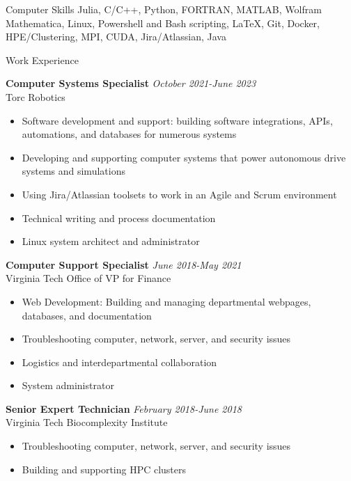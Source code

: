 \documentclass{resume} %
\begin{document}
\begin{rSection}{Computer Skills}
    Julia, C/C++, Python, FORTRAN, MATLAB, Wolfram Mathematica, Linux, Powershell and Bash scripting, LaTeX, Git, Docker, HPE/Clustering, MPI, CUDA, Jira/Atlassian, Java
\end{rSection}

\begin{rSection}{Work Experience}

\textbf{Computer Systems Specialist} \hfill \textit{October 2021-June 2023} \\
Torc Robotics
 \begin{itemize}
    \itemsep -3pt {} 
     \item Software development and support: building software integrations, APIs, automations, and databases for numerous systems
     \item Developing and supporting computer systems that power autonomous drive systems and simulations
     \item Using Jira/Atlassian toolsets to work in an Agile and Scrum environment
     \item Technical writing and process documentation
     \item Linux system architect and administrator
 \end{itemize}
 
\textbf{Computer Support Specialist} \hfill \textit{June 2018-May 2021} \\
Virginia Tech Office of VP for Finance
 \begin{itemize}
    \itemsep -3pt {} 
     \item Web Development: Building and managing departmental webpages, databases, and documentation
     \item Troubleshooting computer, network, server, and security issues
     \item Logistics and interdepartmental collaboration
     \item System administrator
 \end{itemize}

\vspace{10pt}

 \textbf{Senior Expert Technician} \hfill \textit{February 2018-June 2018} \\
 Virginia Tech Biocomplexity Institute
  \begin{itemize}
     \itemsep -3pt {} 
      \item Troubleshooting computer, network, server, and security issues
      \item Building and supporting HPC clusters
  \end{itemize}


\end{rSection}
\end{document}
